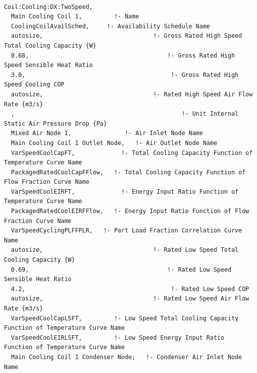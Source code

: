 \begin{lstlisting}

Coil:Cooling:DX:TwoSpeed,
  Main Cooling Coil 1,         !- Name
  CoolingCoilAvailSched,     !- Availability Schedule Name
  autosize,                               !- Gross Rated High Speed Total Cooling Capacity {W}
  0.68,                                       !- Gross Rated High Speed Sensible Heat Ratio
  3.0,                                         !- Gross Rated High Speed Cooling COP
  autosize,                               !- Rated High Speed Air Flow Rate {m3/s}
  ,                                               !- Unit Internal Static Air Pressure Drop {Pa}
  Mixed Air Node 1,               !- Air Inlet Node Name
  Main Cooling Coil 1 Outlet Node,   !- Air Outlet Node Name
  VarSpeedCoolCapFT,             !- Total Cooling Capacity Function of Temperature Curve Name
  PackagedRatedCoolCapFFlow,   !- Total Cooling Capacity Function of Flow Fraction Curve Name
  VarSpeedCoolEIRFT,             !- Energy Input Ratio Function of Temperature Curve Name
  PackagedRatedCoolEIRFFlow,   !- Energy Input Ratio Function of Flow Fraction Curve Name
  VarSpeedCyclingPLFFPLR,   !- Part Load Fraction Correlation Curve Name
  autosize,                               !- Rated Low Speed Total Cooling Capacity {W}
  0.69,                                       !- Rated Low Speed Sensible Heat Ratio
  4.2,                                         !- Rated Low Speed COP
  autosize,                               !- Rated Low Speed Air Flow Rate {m3/s}
  VarSpeedCoolCapLSFT,         !- Low Speed Total Cooling Capacity Function of Temperature Curve Name
  VarSpeedCoolEIRLSFT,         !- Low Speed Energy Input Ratio Function of Temperature Curve Name
  Main Cooling Coil 1 Condenser Node;   !- Condenser Air Inlet Node Name



\end{lstlisting}
